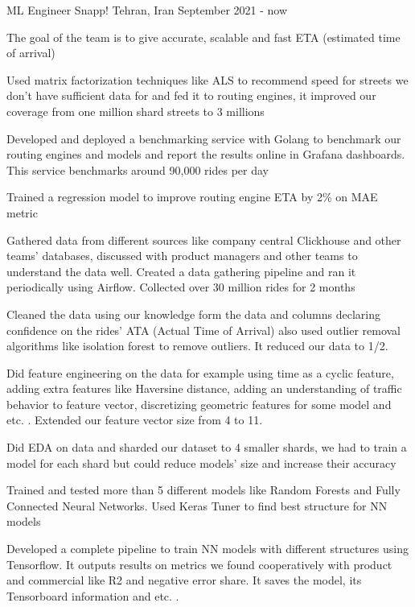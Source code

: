 \begin{cventries}
  \cventry
    {ML Engineer} %
    {Snapp!} %
    {Tehran, Iran} %
    {September 2021 - now} %
    {
      \begin{cvitems} %
        \item The goal of the team is to give accurate, scalable and fast ETA (estimated time of arrival)
        \item Used matrix factorization techniques like ALS to recommend speed for streets we don't have sufficient data for and fed it to routing engines, it improved our coverage from one million shard streets to 3 millions
        \item Developed and deployed a benchmarking service with Golang to benchmark our routing engines and models and report the results online in Grafana dashboards. This service benchmarks around 90,000 rides per day
        \item Trained a regression model to improve routing engine ETA by 2\% on MAE metric
        \item Gathered data from different sources like company central Clickhouse and other teams' databases, discussed with product managers and other teams to understand the data well. Created a data gathering pipeline and ran it periodically using Airflow. Collected over 30 million rides for 2 months
        \item Cleaned the data using our knowledge form the data and columns declaring confidence on the rides' ATA (Actual Time of Arrival) also used outlier removal algorithms like isolation forest to remove outliers. It reduced our data to 1/2.
        \item Did feature engineering on the data for example using time as a cyclic feature, adding extra features like Haversine distance, adding an understanding of traffic behavior to feature vector, discretizing geometric features for some model and etc. . Extended our feature vector size from 4 to 11.
        \item Did EDA on data and sharded our dataset to 4 smaller shards, we had to train a model for each shard but could reduce models' size and increase their accuracy
        \item Trained and tested more than 5 different models like Random Forests and Fully Connected Neural Networks. Used Keras Tuner to find best structure for NN models
        \item Developed a complete pipeline to train NN models with different structures using Tensorflow. It outputs results on metrics we found cooperatively with product and commercial like R2 and negative error share. It saves the model, its Tensorboard information and etc. .

\end{cvitems}}
\end{cventries}
